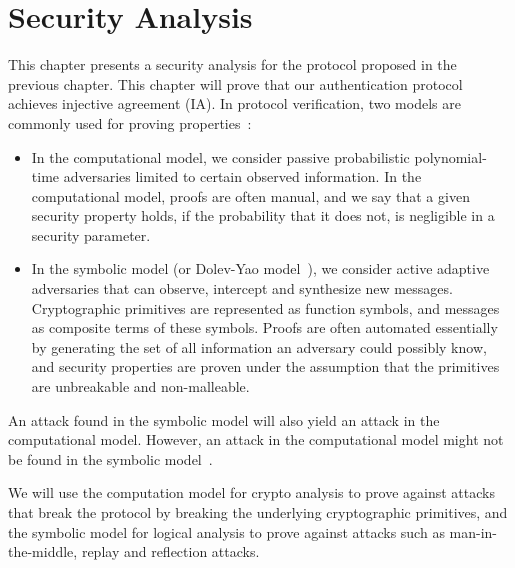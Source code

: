 \chapter{Security Analysis}\label{ch:security}

This chapter presents a security analysis for the protocol proposed in the previous chapter. This chapter will prove that our authentication protocol achieves injective agreement (IA).
In protocol verification, two models are commonly used for proving properties~\cite{blanchet2012security}:

\begin{itemize}
    \item In the computational model, we consider passive probabilistic polynomial-time adversaries limited to certain observed information. In the computational model, proofs are often manual, and we say that a given security property holds, if the probability that it does not, is negligible in a security parameter.
   
   \item In the symbolic model (or Dolev-Yao model~\cite{dolev1983security}), we consider active adaptive adversaries  that can observe, intercept and synthesize new messages.
   Cryptographic primitives are represented as function symbols, and messages as composite terms of these symbols.
   Proofs are often automated essentially by generating the set of all information an adversary could possibly know, and security properties are proven under the assumption that the primitives are unbreakable and non-malleable.
   
\end{itemize}
   
    

An attack found in the symbolic model will also yield an attack in the computational model. However, an attack in the computational model might not be found in the symbolic model~\cite{blanchet2012security}.

We will use the computation model for crypto analysis to prove against attacks that break the protocol by breaking the underlying cryptographic primitives, and the symbolic model for logical analysis to prove against attacks such as man-in-the-middle, replay and reflection attacks. 


